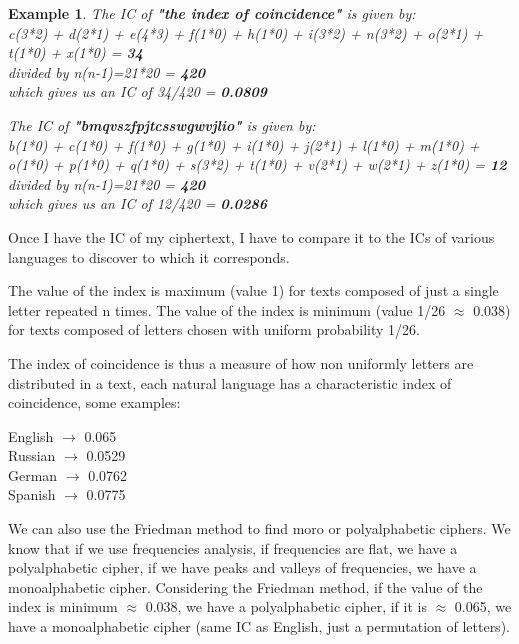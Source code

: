 \documentclass[a4paper, 12pt]{report}
\newtheorem{example}{\textbf{Example}}
\begin{document}
\begin{example}
	The IC of \textbf{"the index of coincidence"} is given by:\\
	c(3*2) + d(2*1) + e(4*3) + f(1*0) + h(1*0) + i(3*2) + n(3*2) + o(2*1) + t(1*0) + x(1*0) = \textbf{34}\\
	divided by n(n-1)=21*20 = \textbf{420}\\
	which gives us an IC of 34/420 = \textbf{0.0809}
	
	\vspace{5mm}
	The IC of \textbf{"bmqvszfpjtcsswgwvjlio"} is given by:\\
	b(1*0) + c(1*0) + f(1*0) + g(1*0) + i(1*0) + j(2*1) + l(1*0) + m(1*0) + o(1*0) + p(1*0) + q(1*0) + s(3*2) + t(1*0) + v(2*1) + w(2*1) + z(1*0) = \textbf{12}\\
	divided by n(n-1)=21*20 = \textbf{420}\\
	which gives us an IC of 12/420 = \textbf{0.0286} 
\end{example}

Once I have the IC of my ciphertext, I have to compare it to the ICs of various languages to discover to which it corresponds.

The value of the index is maximum (value 1) for texts composed of just a single letter repeated n times.  The value of the index is minimum (value 1/26 $\approx$ 0.038) for texts composed of letters chosen with uniform probability 1/26.
 
The index of coincidence is thus a measure of how non uniformly letters are distributed in a text, each natural language has a characteristic index of coincidence, some examples:
\begin{center}
	English $\rightarrow$ 0.065\\
	Russian $\rightarrow$ 0.0529\\
	German $\rightarrow$ 0.0762\\
	Spanish $\rightarrow$ 0.0775
\end{center}

We can also use the Friedman method to find moro or polyalphabetic ciphers. We know that if we use frequencies analysis, if frequencies are flat, we have a polyalphabetic cipher, if we have peaks and valleys of frequencies, we have a monoalphabetic cipher. Considering the Friedman method, if the value of the index is minimum $\approx$ 0.038, we have a polyalphabetic cipher, if it is $\approx$ 0.065, we have a monoalphabetic cipher (same IC as English, just a permutation of letters).
\end{document}
